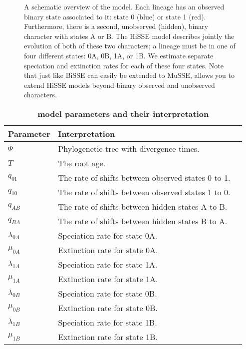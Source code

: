 \begin{figure}[h!]
\centering
{}
\caption{\small A schematic overview of the \HiSSE model. Each lineage has an observed binary state associated to it: state 0 (blue) or state 1 (red). 
Furthermore, there is a second, unobserved (hidden), binary character with states A or B.
The HiSSE model describes jointly the evolution of both of these two characters; a lineage
    must be in one of four different states: 0A, 0B, 1A, or 1B.
    We estimate separate speciation and extinction rates for each of these four states.
    Note that just like BiSSE can easily be extended to MuSSE,
    \RevBayes allows you to extend HiSSE models beyond binary observed and unobserved characters.}
\label{fig:HiSSE_Schematic}
\end{figure} \label{fig:hisse}



\begin{table}[t!]
	\centering
	\caption{\bf{\HiSSE model parameters and their interpretation}} \label{tab:Hparam}
	\begin{tabular}{ l l l }
		\toprule
		Parameter & Interpretation \\
		\midrule
		$\Psi$ & Phylogenetic tree with divergence times.\\
		\rowcolor{gray!15} $T$ & The root age.\\
		$q_{01}$ & The rate of shifts between observed states 0 to 1.\\
		\rowcolor{gray!15} $q_{10}$ & The rate of shifts between observed states 1 to 0.\\
		$q_{AB}$ & The rate of shifts between hidden states A to B.\\
		\rowcolor{gray!15} $q_{BA}$ & The rate of shifts between hidden states B to A.\\
        $\lambda_{0A}$ & Speciation rate for state 0A.\\
        \rowcolor{gray!15} $\mu_{0A}$ & Extinction rate for state 0A.\\
        $\lambda_{1A}$ & Speciation rate for state 1A.\\
        \rowcolor{gray!15} $\mu_{1A}$ & Extinction rate for state 1A.\\
        $\lambda_{0B}$ & Speciation rate for state 0B.\\
        \rowcolor{gray!15} $\mu_{0B}$ & Extinction rate for state 0B.\\
        $\lambda_{1B}$ & Speciation rate for state 1B.\\
        \rowcolor{gray!15} $\mu_{1B}$ & Extinction rate for state 1B.\\
	\end{tabular}
\end{table}


